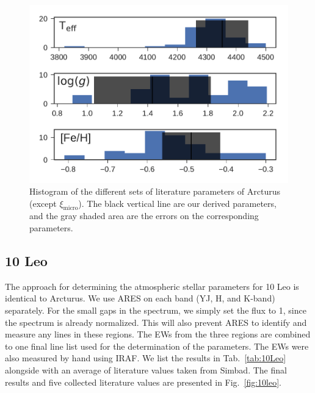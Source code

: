 \documentclass{aa}
\begin{document}
\begin{figure}[htpb!]
    \centering
    \includegraphics[width=1.0\linewidth]{figures/ArcturusParams.pdf}
    \caption{Histogram of the different sets of literature parameters of
             Arcturus (except $\xi_\mathrm{micro}$). The black vertical line are
             our derived parameters, and the gray shaded area are the errors on
             the corresponding parameters.}
    \label{fig:arcturus}
\end{figure}



\subsection{10 Leo}
\label{sec:10Leo}

The approach for determining the atmospheric stellar parameters for 10 Leo is
identical to Arcturus. We use ARES on each band (YJ, H, and K-band) separately.
For the small gaps in the spectrum, we simply set the flux to 1, since the
spectrum is already normalized. This will also prevent ARES to identify and
measure any lines in these regions. The EWs from the three regions are combined
to one final line list used for the determination of the parameters. The EWs
were also measured by hand using IRAF. We list the results in
Tab.~\ref{tab:10Leo} alongside with an average of literature values taken from
Simbad. The final results and five collected literature values are presented in
Fig.~\ref{fig:10leo}.
\end{document}
